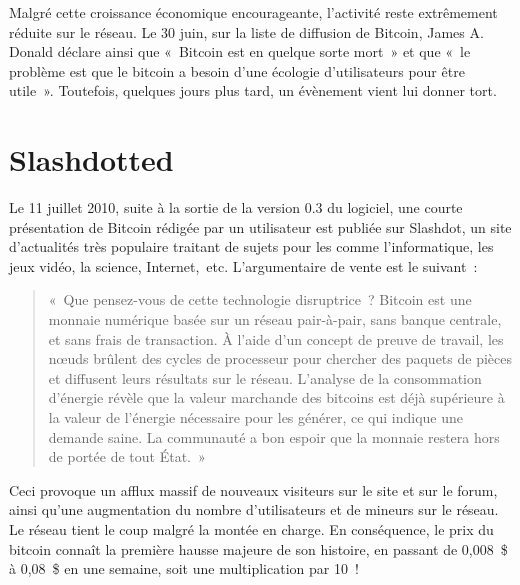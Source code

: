 Malgré cette croissance économique encourageante, l'activité reste extrêmement réduite sur le réseau. Le 30 juin, sur la liste de diffusion de Bitcoin, James A. Donald déclare ainsi que «~Bitcoin est en quelque sorte mort~» et que «~le problème est que le bitcoin a besoin d'une écologie d'utilisateurs pour être utile~». Toutefois, quelques jours plus tard, un évènement vient lui donner tort.

\section*{Slashdotted}

Le 11 juillet 2010, suite à la sortie de la version 0.3 du logiciel, une courte présentation de Bitcoin rédigée par un utilisateur est publiée sur Slashdot, un site d'actualités très populaire traitant de sujets pour les  comme l'informatique, les jeux vidéo, la science, Internet,~etc. L'argumentaire de vente est le suivant~:

\begin{quote}
«~Que pensez-vous de cette technologie disruptrice~? Bitcoin est une monnaie numérique basée sur un réseau pair-à-pair, sans banque centrale, et sans frais de transaction. À l'aide d'un concept de preuve de travail, les nœuds brûlent des cycles de processeur pour chercher des paquets de pièces et diffusent leurs résultats sur le réseau. L'analyse de la consommation d'énergie révèle que la valeur marchande des bitcoins est déjà supérieure à la valeur de l'énergie nécessaire pour les générer, ce qui indique une demande saine. La communauté a bon espoir que la monnaie restera hors de portée de tout État.~»
\end{quote}

Ceci provoque un afflux massif de nouveaux visiteurs sur le site et sur le forum, ainsi qu'une augmentation du nombre d'utilisateurs et de mineurs sur le réseau. Le réseau tient le coup malgré la montée en charge. En conséquence, le prix du bitcoin connaît la première hausse majeure de son histoire, en passant de 0,008~\$ à 0,08~\$ en une semaine, soit une multiplication par 10~!

